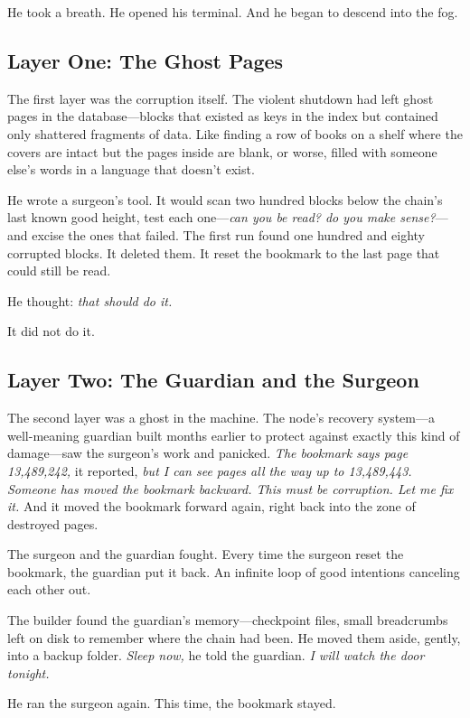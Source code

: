 \documentclass[11pt,a4paper]{article}
\begin{document}
He took a breath. He opened his terminal. And he began to descend into the fog.

\subsection*{Layer One: The Ghost Pages}

The first layer was the corruption itself. The violent shutdown had left ghost pages in the database---blocks that existed as keys in the index but contained only shattered fragments of data. Like finding a row of books on a shelf where the covers are intact but the pages inside are blank, or worse, filled with someone else's words in a language that doesn't exist.

He wrote a surgeon's tool. It would scan two hundred blocks below the chain's last known good height, test each one---\textit{can you be read? do you make sense?}---and excise the ones that failed. The first run found one hundred and eighty corrupted blocks. It deleted them. It reset the bookmark to the last page that could still be read.

He thought: \textit{that should do it.}

It did not do it.

\subsection*{Layer Two: The Guardian and the Surgeon}

The second layer was a ghost in the machine. The node's recovery system---a well-meaning guardian built months earlier to protect against exactly this kind of damage---saw the surgeon's work and panicked. \textit{The bookmark says page 13,489,242,} it reported, \textit{but I can see pages all the way up to 13,489,443. Someone has moved the bookmark backward. This must be corruption. Let me fix it.} And it moved the bookmark forward again, right back into the zone of destroyed pages.

The surgeon and the guardian fought. Every time the surgeon reset the bookmark, the guardian put it back. An infinite loop of good intentions canceling each other out.

The builder found the guardian's memory---checkpoint files, small breadcrumbs left on disk to remember where the chain had been. He moved them aside, gently, into a backup folder. \textit{Sleep now,} he told the guardian. \textit{I will watch the door tonight.}

He ran the surgeon again. This time, the bookmark stayed.
\end{document}
